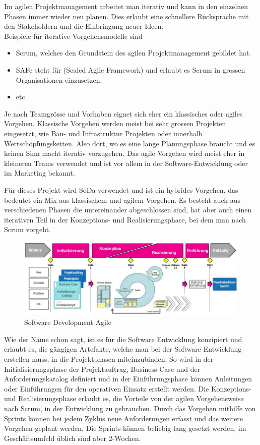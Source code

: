 \documentclass[a4paper, table]{article}
\begin{document}
Im agilen Projektmanagement arbeitet man iterativ und kann in den einzelnen Phasen immer wieder neu planen.
Dies erlaubt eine schnellere Rücksprache mit den Stakeholdern und die Einbringung neuer Ideen. \\
Beispiele für iterative Vorgehensmodelle sind
\begin{itemize}
    \item Scrum, welches den Grundstein des agilen Projektmanagement gebildet hat.
    \item SAFe steht für (Scaled Agile Framework) und erlaubt es Scrum in grossen Organisationen einzusetzen.
    \item etc. \autocite{noauthor_liste_2022}
\end{itemize}

Je nach Teamgrösse und Vorhaben eignet sich eher ein klassisches oder agiles Vorgehen.
Klassische Vorgehen werden meist bei sehr grossen Projekten eingesetzt, wie Bau- und Infrastruktur Projekten oder
innerhalb Wertschöpfungsketten. Also dort, wo es eine lange Planungsphase braucht und es keinen Sinn macht iterativ vorzugehen.
Das agile Vorgehen wird meist eher in kleineren Teams verwendet und ist vor allem in der Software-Entwicklung oder
im Marketing bekannt.
\newline

Für dieses Projekt wird \gls{SoDa} verwendet und ist ein hybrides Vorgehen,
das bedeutet ein Mix aus klassischem und agilem Vorgehen.
Es besteht auch aus verschiedenen Phasen die untereinander abgeschlossen sind,
hat aber auch einen iterativen Teil in der Konzeptions- und Realisierungsphase, bei dem man nach Scrum vorgeht.

\begin{figure}[h]
    \centering
    \includegraphics[width=1.0\textwidth]{img/SoDa.png}
    \caption{Software Development Agile}
    \label{fig:SoDa}
\end{figure}


Wie der Name schon sagt, ist es für die Software Entwicklung konzipiert und erlaubt es, die gängigen Artefakte,
welche man bei der Software Entwicklung erstellen muss, in die Projektphasen miteinzubinden.
So wird in der Initialisierungsphase der Projektauftrag, Business-Case und der Anforderungskatalog definiert und
in der Einführungsphase können Anleitungen oder Einführungen für den operativen Einsatz erstellt werden.
Die Konzeptions- und Realisierungsphase erlaubt es, die Vorteile von der agilen Vorgehensweise nach Scrum,
in der Entwicklung zu gebrauchen. Durch das Vorgehen mithilfe von Sprints können bei jedem Zyklus neue
Anforderungen erfasst und das weitere Vorgehen geplant werden. Die Sprints können beliebig lang gesetzt werden,
im Geschäftsumfeld üblich sind aber 2-Wochen.
\end{document}
